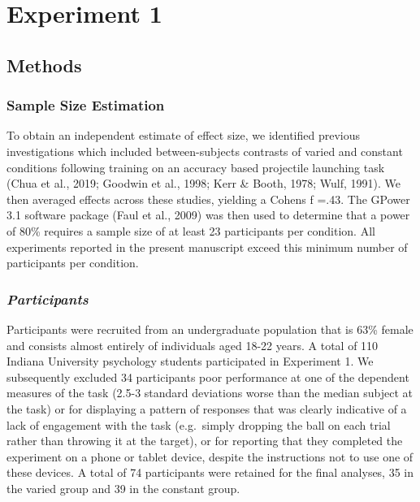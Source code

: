 \documentclass[
  man,floatsintext]{apa7}
\begin{document}
\hypertarget{experiment-1}{%
\section{Experiment 1}\label{experiment-1}}

\hypertarget{methods}{%
\subsection{Methods}\label{methods}}

\hypertarget{sample-size-estimation}{%
\subsubsection{Sample Size Estimation}\label{sample-size-estimation}}

To obtain an independent estimate of effect size, we identified previous investigations which included between-subjects contrasts of varied and constant conditions following training on an accuracy based projectile launching task (Chua et al., 2019; Goodwin et al., 1998; Kerr \& Booth, 1978; Wulf, 1991). We then averaged effects across these studies, yielding a Cohens f =.43. The GPower 3.1 software package (Faul et al., 2009) was then used to determine that a power of 80\% requires a sample size of at least 23 participants per condition. All experiments reported in the present manuscript exceed this minimum number of participants per condition.

\hypertarget{participants}{%
\subsubsection{\texorpdfstring{\emph{Participants}}{Participants}}\label{participants}}

Participants were recruited from an undergraduate population that is 63\% female and consists almost entirely of individuals aged 18-22 years. A total of 110 Indiana University psychology students participated in Experiment 1. We subsequently excluded 34 participants poor performance at one of the dependent measures of the task (2.5-3 standard deviations worse than the median subject at the task) or for displaying a pattern of responses that was clearly indicative of a lack of engagement with the task (e.g.~simply dropping the ball on each trial rather than throwing it at the target), or for reporting that they completed the experiment on a phone or tablet device, despite the instructions not to use one of these devices. A total of 74 participants were retained for the final analyses, 35 in the varied group and 39 in the constant group.
\end{document}
